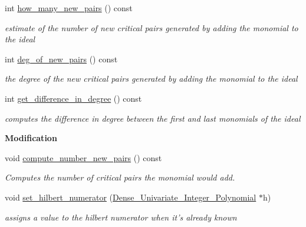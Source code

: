 \begin{Indent}
\begin{DoxyCompactItemize}
\mbox{\label{group___g_b_computation_afb9a43c24f2d0405d1c60e12983c8003}} 
int \hyperlink{group___g_b_computation_afb9a43c24f2d0405d1c60e12983c8003}{how\+\_\+many\+\_\+new\+\_\+pairs} () const
\begin{DoxyCompactList}\small\item\em estimate of the number of new critical pairs generated by adding the monomial to the ideal \end{DoxyCompactList}\item 
\mbox{\label{group___g_b_computation_a68c0ece8174abdb6d2955d63f04cd437}} 
int \hyperlink{group___g_b_computation_a68c0ece8174abdb6d2955d63f04cd437}{deg\+\_\+of\+\_\+new\+\_\+pairs} () const
\begin{DoxyCompactList}\small\item\em the degree of the new critical pairs generated by adding the monomial to the ideal \end{DoxyCompactList}\item 
\mbox{\label{group___g_b_computation_af9a60da2d124f45b884b93704b45cc45}} 
int \hyperlink{group___g_b_computation_af9a60da2d124f45b884b93704b45cc45}{get\+\_\+difference\+\_\+in\+\_\+degree} () const
\begin{DoxyCompactList}\small\item\em computes the difference in degree between the first and last monomials of the ideal \end{DoxyCompactList}\end{DoxyCompactItemize}
\end{Indent}
\begin{Indent}\textbf{ Modification}\par
\begin{DoxyCompactItemize}
\item 
\mbox{\label{group___g_b_computation_a8549c4626e69e8488078892f993a39c2}} 
void \hyperlink{group___g_b_computation_a8549c4626e69e8488078892f993a39c2}{compute\+\_\+number\+\_\+new\+\_\+pairs} () const
\begin{DoxyCompactList}\small\item\em Computes the number of critical pairs the monomial would add. \end{DoxyCompactList}\item 
\mbox{\label{group___g_b_computation_a20bb441439236bcce2d9e87b8486553f}} 
void \hyperlink{group___g_b_computation_a20bb441439236bcce2d9e87b8486553f}{set\+\_\+hilbert\+\_\+numerator} (\hyperlink{group__polygroup_class_dense___univariate___integer___polynomial}{Dense\+\_\+\+Univariate\+\_\+\+Integer\+\_\+\+Polynomial} $\ast$h)
\begin{DoxyCompactList}\small\item\em assigns a value to the hilbert numerator when it's already known \end{DoxyCompactList}\end{DoxyCompactItemize}
\end{Indent}
